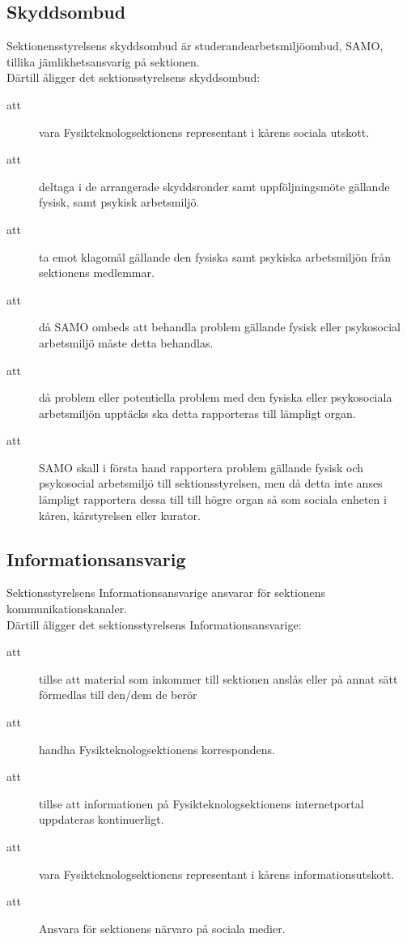 \subsection{Skyddsombud}
Sektionensstyrelsens skyddsombud är studerandearbetsmiljöombud, SAMO, tillika jämlikhetsansvarig på sektionen.\\
Därtill åligger det sektionsstyrelsens skyddsombud:
\begin{description}

\item[att] vara Fysikteknologsektionens representant i kårens sociala utskott. 
\item[att] deltaga i de arrangerade skyddsronder samt uppföljningsmöte gällande fysisk, samt psykisk arbetsmiljö.
\item[att] ta emot klagomål gällande den fysiska samt psykiska arbetsmiljön från sektionens medlemmar.
\item[att] då SAMO ombeds att behandla problem gällande fysisk eller psykosocial arbetsmiljö måste detta behandlas.
\item[att] då problem eller potentiella problem med den fysiska eller psykosociala arbetsmiljön upptäcks ska detta rapporteras till lämpligt organ.
\item[att] SAMO skall i första hand rapportera problem gällande fysisk och psykosocial arbetsmiljö till sektionsstyrelsen, men då detta inte anses lämpligt rapportera dessa till till högre organ så som sociala enheten i kåren, kårstyrelsen eller kurator.
\end{description}

\subsection{Informationsansvarig}
Sektionsstyrelsens Informationsansvarige ansvarar för sektionens kommunikationskanaler.\\ Därtill åligger det sektionsstyrelsens Informationsansvarige:
\begin{description}

\item[att] tillse att material som inkommer till sektionen anslås eller på annat sätt förmedlas till den/dem de berör
\item[att] handha Fysikteknologsektionens korrespondens.
\item[att] tillse att informationen på Fysikteknologsektionens internetportal
uppdateras kontinuerligt.
\item[att] vara Fysikteknologsektionens representant i kårens informationsutskott.
\item[att] Ansvara för sektionens närvaro på sociala medier.
\end{description}

